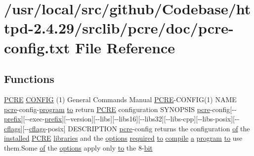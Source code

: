 \hypertarget{pcre-config_8txt}{}\section{/usr/local/src/github/\+Codebase/httpd-\/2.4.29/srclib/pcre/doc/pcre-\/config.txt File Reference}
\label{pcre-config_8txt}
\subsection*{Functions}
\begin{DoxyCompactItemize}
\item 
\hyperlink{pcre_8txt_a970782a5ef22596881e664deb789f171}{P\+C\+RE} \hyperlink{pcre-config_8txt_a5da1f0b5a1aef2f657b7f5a0352c337a}{C\+O\+N\+F\+IG} (1) General Commands Manual \hyperlink{pcre_8txt_a970782a5ef22596881e664deb789f171}{P\+C\+RE}-\/C\+O\+N\+F\+IG(1) N\+A\+ME \hyperlink{pcre_8h_a2bc1b88cfd3d453b96bdc5411a22484f}{pcre}-\/config-\/\hyperlink{pcretest_8txt_a48917cf15a1089461e55bc56de9a58c3}{program} \hyperlink{pcretest_8txt_aa22c98f630e4b3fe86ee17ce5150c62f}{to} return \hyperlink{pcre_8txt_a970782a5ef22596881e664deb789f171}{P\+C\+RE} configuration S\+Y\+N\+O\+P\+S\+IS \hyperlink{pcre_8h_a2bc1b88cfd3d453b96bdc5411a22484f}{pcre}-\/config\mbox{[}-\/-\/\hyperlink{testmemcache_8c_a93ad9b26ead3bd83914b4942f572f283}{prefix}\mbox{]}\mbox{[}-\/-\/exec-\/\hyperlink{testmemcache_8c_a93ad9b26ead3bd83914b4942f572f283}{prefix}\mbox{]}\mbox{[}-\/-\/version\mbox{]}\mbox{[}-\/-\/libs\mbox{]}\mbox{[}-\/-\/libs16\mbox{]}\mbox{[}-\/-\/libs32\mbox{]}\mbox{[}-\/-\/libs-\/cpp\mbox{]}\mbox{[}-\/-\/libs-\/posix\mbox{]}\mbox{[}-\/-\/\hyperlink{group__APACHE__CORE__DAEMON_ga3defcfc322adaa47f01e20261c7483ff}{cflags}\mbox{]}\mbox{[}-\/-\/\hyperlink{group__APACHE__CORE__DAEMON_ga3defcfc322adaa47f01e20261c7483ff}{cflags}-\/posix\mbox{]} D\+E\+S\+C\+R\+I\+P\+T\+I\+ON \hyperlink{pcre_8h_a2bc1b88cfd3d453b96bdc5411a22484f}{pcre}-\/config returns the configuration \hyperlink{pcre_8txt_a9d5b55a535a7d176d14b62d664b47b4d}{of} the \hyperlink{README_8txt_abf5a4a7b9414b8b9683ee861c8a64879}{installed} \hyperlink{pcre_8txt_a970782a5ef22596881e664deb789f171}{P\+C\+RE} \hyperlink{pcre_8txt_ae4aecc72ae4789d0b7d4d9280e7679a1}{libraries} and the \hyperlink{pcre_8txt_aefb1fa742c21909e746b978f6e1d7e17}{options} \hyperlink{pcre_8txt_af145e40b1ba232f2bf45de280f4e63dd}{required} \hyperlink{pcretest_8txt_aa22c98f630e4b3fe86ee17ce5150c62f}{to} \hyperlink{pcretest_8txt_a82c5cb071eb724ee382baacb76c44a27}{compile} \hyperlink{pcre_8txt_a841271aab70f5cda9412a19c7753f02c}{a} \hyperlink{pcretest_8txt_a48917cf15a1089461e55bc56de9a58c3}{program} \hyperlink{pcretest_8txt_aa22c98f630e4b3fe86ee17ce5150c62f}{to} use them.\+Some \hyperlink{pcre_8txt_a9d5b55a535a7d176d14b62d664b47b4d}{of} the \hyperlink{pcre_8txt_aefb1fa742c21909e746b978f6e1d7e17}{options} apply only \hyperlink{pcretest_8txt_aa22c98f630e4b3fe86ee17ce5150c62f}{to} the 8-\/\hyperlink{pcretest_8txt_aeddb586b79a44fb202dde924852cbbf6}{bit}

\end{DoxyCompactItemize}
